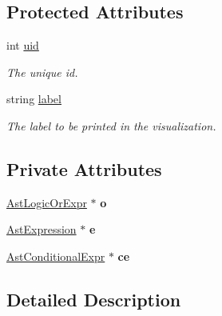 \subsection*{Protected Attributes}
\begin{DoxyCompactItemize}
\item 
\hypertarget{classAST_a847b778f1c3dd5a19de32de432ee6e15}{int \hyperlink{classAST_a847b778f1c3dd5a19de32de432ee6e15}{uid}}\label{classAST_a847b778f1c3dd5a19de32de432ee6e15}

\begin{DoxyCompactList}\small\item\em The unique id. \end{DoxyCompactList}\item 
\hypertarget{classAST_ab2e239ccc0688d2341724432ff5a1a31}{string \hyperlink{classAST_ab2e239ccc0688d2341724432ff5a1a31}{label}}\label{classAST_ab2e239ccc0688d2341724432ff5a1a31}

\begin{DoxyCompactList}\small\item\em The label to be printed in the visualization. \end{DoxyCompactList}\end{DoxyCompactItemize}
\subsection*{Private Attributes}
\begin{DoxyCompactItemize}
\item 
\hypertarget{classAstConditionalExpr_aa751ca473c16cc01f3d4f1d5c3030e32}{\hyperlink{classAstLogicOrExpr}{Ast\-Logic\-Or\-Expr} $\ast$ {\bfseries o}}\label{classAstConditionalExpr_aa751ca473c16cc01f3d4f1d5c3030e32}

\item 
\hypertarget{classAstConditionalExpr_a3a694cdafe4bbcfcc351b66ba53eaae7}{\hyperlink{classAstExpression}{Ast\-Expression} $\ast$ {\bfseries e}}\label{classAstConditionalExpr_a3a694cdafe4bbcfcc351b66ba53eaae7}

\item 
\hypertarget{classAstConditionalExpr_a26eacea361c4bfc30b77515c7332ed3a}{\hyperlink{classAstConditionalExpr}{Ast\-Conditional\-Expr} $\ast$ {\bfseries ce}}\label{classAstConditionalExpr_a26eacea361c4bfc30b77515c7332ed3a}

\end{DoxyCompactItemize}


\subsection{Detailed Description}


